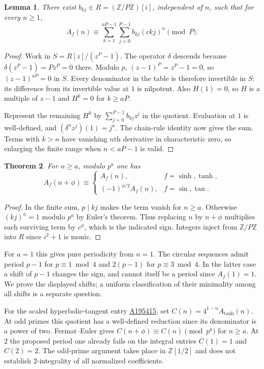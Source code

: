 \documentclass[11pt,letterpaper]{article}
\newtheorem{theorem}{Theorem}
\newtheorem{lemma}[theorem]{Lemma}
\newcommand{\oeis}[1]{\href{https://oeis.org/A#1}{A#1}}
\begin{document}
\begin{lemma}
There exist $b_{kj}\in R=(\mathbb Z/P\mathbb Z)[i]$, independent of $n$, such that for every $n\ge1$,
\[
 A_f(n)\equiv\sum_{k=1}^{aP-1}\sum_{j=0}^{P-1}b_{kj}(ckj)^n \pmod{P}.
\]
\end{lemma}
\begin{proof}
Work in $S=R[z]/(z^P-1)$. The operator $\delta$ descends because $\delta(z^P-1)=Pz^P=0$ there. Modulo $p$, $(z-1)^P=z^P-1=0$, so $(z-1)^{aP}=0$ in $S$. Every denominator in the table is therefore invertible in $S$: its difference from its invertible value at $1$ is nilpotent. Also $H(1)=0$, so $H$ is a multiple of $z-1$ and $H^k=0$ for $k\ge aP$.

Represent the remaining $H^k$ by $\sum_{j=0}^{P-1}b_{kj}z^j$ in the quotient. Evaluation at $1$ is well-defined, and $(\delta^n z^j)(1)=j^n$. The chain-rule identity now gives the sum. Terms with $k>n$ have vanishing $n$th derivative in characteristic zero, so enlarging the finite range when $n<aP-1$ is valid.
\end{proof}

\begin{theorem}
For $n\ge a$, modulo $p^a$ one has
\[
 A_f(n+\phi)\equiv
 \begin{cases}
 A_f(n),&f=\sinh,\tanh,\\
 (-1)^{\phi/2}A_f(n),&f=\sin,\tan .
 \end{cases}
\]
\end{theorem}
\begin{proof}
In the finite sum, $p\mid kj$ makes the term vanish for $n\ge a$. Otherwise $(kj)^\phi=1$ modulo $p^a$ by Euler's theorem. Thus replacing $n$ by $n+\phi$ multiplies each surviving term by $c^\phi$, which is the indicated sign. Integers inject from $\mathbb Z/P\mathbb Z$ into $R$ since $i^2+1$ is monic.
\end{proof}

For $a=1$ this gives pure periodicity from $n=1$. The circular sequences admit period $p-1$ for $p\equiv1\bmod4$ and $2(p-1)$ for $p\equiv3\bmod4$. In the latter case a shift of $p-1$ changes the sign, and cannot itself be a period since $A_f(1)=1$. We prove the displayed shifts; a uniform classification of their minimality among all shifts is a separate question.

For the scaled hyperbolic-tangent entry \oeis{195415}, set $C(n)=4^{1-n}A_{\tanh}(n)$. At odd primes this quotient has a well-defined reduction since its denominator is a power of two. Fermat--Euler gives $C(n+\phi)\equiv C(n)\pmod{p^a}$ for $n\ge a$. At $2$ the proposed period one already fails on the integral entries $C(1)=1$ and $C(2)=2$. The odd-prime argument takes place in $\mathbb Z[1/2]$ and does not establish $2$-integrality of all normalized coefficients.
\end{document}
